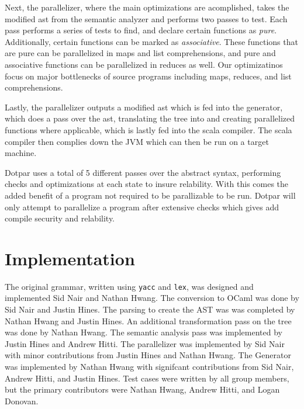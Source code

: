 Next, the parallelizer, where the main optimizations are acomplished, takes 
the modified ast from the semantic analyzer and performs two passes to test. 
Each pass performs a series of tests to find, and declare certain functions as
\emph{pure}. Additionally, certain functions can be marked as
\emph{associative}.
These functions that are pure can be parallelized in maps and list
comprehensions, and pure and associative functions can be parallelized in
reduces as well. Our optimizatinos focus on major bottlenecks of source programs
including maps, reduces, and list comprehensions.

Lastly, the parallelizer outputs a modified ast which is fed into the generator, 
which does a pass over the ast, translating the tree into and creating parallelized 
functions where applicable, which is lastly fed into the scala compiler.  The
scala compiler then complies down the JVM which can then be run on a target machine.

Dotpar uses a total of 5 different passes over the abstract syntax, performing 
checks and optimizations at each state to insure relability.  With this comes
the added benefit of a program not required to be parallizable to be run.  Dotpar
will only attempt to parallelize a program after extensive checks which gives add 
compile security and relability.

\section{Implementation}
The original grammar, written using \verb=yacc= and \verb=lex=, was designed and
implemented Sid Nair and Nathan Hwang. The conversion to OCaml was done by Sid
Nair and Justin Hines. The parsing to create the AST was was completed by
Nathan Hwang and Justin Hines. An additional transformation pass on the tree was
done by Nathan Hwang. The semantic analysis pass was implemented by Justin
Hines and Andrew Hitti. The parallelizer was implemented by Sid Nair with minor
contributions from Justin Hines and Nathan Hwang. The Generator was implemented
by Nathan Hwang with signifcant contributions from Sid Nair, Andrew Hitti, and
Justin Hines. Test cases were written by all group members, but the primary
contributors were Nathan Hwang, Andrew Hitti, and Logan Donovan.
